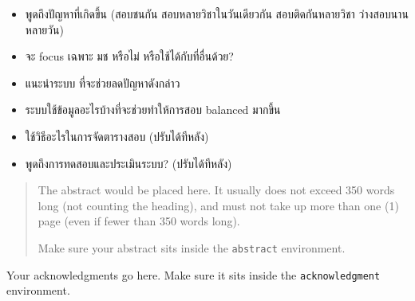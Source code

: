 \begin{abstractTH}
{\begin{itemize}[nosep,leftmargin=*]
    \item พูดถึงปัญหาที่เกิดขึ้น (สอบชนกัน สอบหลายวิชาในวันเดียวกัน สอบติดกันหลายวิชา ว่างสอบนานหลายวัน)
    \item จะ focus เฉพาะ มช หรือไม่ หรือใช้ได้กับที่อื่นด้วย?
    \item แนะนำระบบ ที่จะช่วยลดปัญหาดังกล่าว
    \item ระบบใช้ข้อมูลอะไรบ้างที่จะช่วยทำให้การสอบ balanced มากขึ้น
    \item ใช้วิธีอะไรในการจัดตารางสอบ (ปรับได้ทีหลัง)
    \item พูดถึงการทดสอบและประเมินระบบ? (ปรับได้ทีหลัง)
\end{itemize}
}
\end{abstractTH}

\begin{abstract}
The abstract would be placed here. It usually does not exceed 350 words
long (not counting the heading), and must not take up more than one (1) page
(even if fewer than 350 words long).

Make sure your abstract sits inside the \texttt{abstract} environment.
\end{abstract}

\iffalse
\begin{dedication}
This document is dedicated to all Chiang Mai University students.

Dedication page is optional.
\end{dedication}
\fi %

\begin{acknowledgments}
Your acknowledgments go here. Make sure it sits inside the
\texttt{acknowledgment} environment.

\end{acknowledgments}%
\fi %

\contentspage

\ifproject
\figurelistpage

\tablelistpage
\fi %



